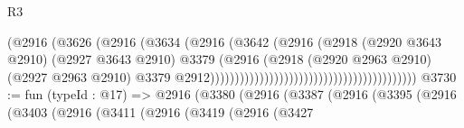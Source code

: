 \begin{lexlean}{R3}
\begin{coremodule}
                                                                    (@2916
                                                                      (@3626
                                                                        (@2916
                                                                          (@3634
                                                                            (@2916
                                                                              (@3642
                                                                                (@2916
                                                                                  (@2918
                                                                                    (@2920
                                                                                      @3643
                                                                                      @2910)
                                                                                    (@2927
                                                                                      @3643
                                                                                      @2910)
                                                                                    @3379
                                                                                    (@2916
                                                                                      (@2918
                                                                                        (@2920
                                                                                          @2963
                                                                                          @2910)
                                                                                        (@2927
                                                                                          @2963
                                                                                          @2910)
                                                                                        @3379
                                                                                        @2912))))))))))))))))))))))))))))))))))))))))))
@3730 := fun (typeId : @17) =>
  @2916
    (@3380
      (@2916
        (@3387
          (@2916
            (@3395
              (@2916
                (@3403
                  (@2916
                    (@3411
                      (@2916
                        (@3419
                          (@2916
                            (@3427

\end{coremodule}
\end{lexlean}
